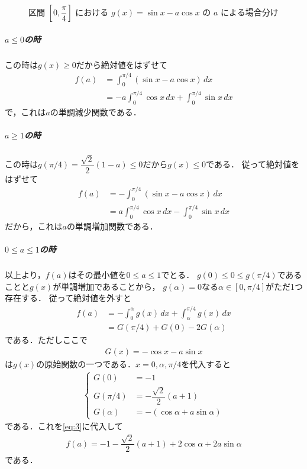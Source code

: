 \documentclass[../../main.tex]{subfiles}
\begin{document}
\begin{figure}[htb]
\begin{center}
  \end{center}
  \caption{区間 $\left[0, \dfrac{\pi}{4}\right]$ における $g(x)=\sin x - a\cos x$ の $a$ による場合分け}
\end{figure}

\subparagraph{$a\le0$の時}
この時は$g(x) \ge 0$だから絶対値をはずせて
\begin{align}
  f(a)
  &=\int_0^{\pi/4}(\sin x-a\cos x)\,dx \\
  &=-a\int_0^{\pi/4}\cos x\,dx+\int_0^{\pi/4}\sin x\,dx
\end{align}
で，これは$a$の単調減少関数である．

\subparagraph{$a\ge1$の時}
この時は$g(\pi/4)=\dfrac{\sqrt{2}}{2}(1-a)\le0$だから$g(x)\le 0$である．
従って絶対値をはずせて
\begin{align}
  f(a)
  &=-\int_0^{\pi/4}(\sin x-a\cos x)\,dx \\
  &=a\int_0^{\pi/4}\cos x\,dx-\int_0^{\pi/4}\sin x\,dx
\end{align}
だから，これは$a$の単調増加関数である．

\subparagraph{$0 \le a \le 1$の時}
以上より，$f(a)$はその最小値を$0 \le a \le 1$でとる．
$g(0)\le0\le g(\pi/4)$であることと$g(x)$が単調増加であることから，
$g(\alpha)=0$なる$\alpha\in[0,\pi/4]$がただ1つ存在する．
従って絶対値を外すと
\begin{align}
  f(a)
  &=-\int_0^\alpha g(x)\,dx+\int_\alpha^{\pi/4}g(x)\,dx \\
  &=G(\pi/4)+G(0)-2G(\alpha) \label{eq:3}
\end{align}
である．ただしここで
\begin{align}
  G(x)=-\cos x-a\sin x
\end{align}
は$g(x)$の原始関数の一つである．$x=0,\alpha,\pi/4$を代入すると
\begin{align}
  \begin{cases}
    G(0)&=-1 \\
    G(\pi/4)&=-\dfrac{\sqrt{2}}{2}(a+1) \\
    G(\alpha)&=-(\cos\alpha+a\sin\alpha)
  \end{cases}
\end{align}
である．これを\cref{eq:3}に代入して
\begin{align}
  f(a)=-1-\dfrac{\sqrt{2}}{2}(a+1)+2\cos\alpha+2a\sin\alpha \label{eq:4}
\end{align}
である．
\end{document}
